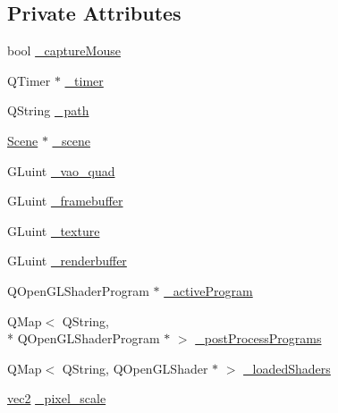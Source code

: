 \subsection*{Private Attributes}
\begin{DoxyCompactItemize}
\item 
bool \hyperlink{class_my_open_g_l_widget_af001d889fec5469aa3e67c11ae48b29d}{\+\_\+capture\+Mouse}
\item 
Q\+Timer $\ast$ \hyperlink{class_my_open_g_l_widget_aa6ba509f0ef6e8c2d266b83e1d380eb8}{\+\_\+timer}
\item 
Q\+String \hyperlink{class_my_open_g_l_widget_a7b3d69ddf0b3509a196edbfeb78407c6}{\+\_\+path}
\item 
\hyperlink{class_scene}{Scene} $\ast$ \hyperlink{class_my_open_g_l_widget_a26a1f259357dd7c8822d715d81591395}{\+\_\+scene}
\item 
G\+Luint \hyperlink{class_my_open_g_l_widget_a63a814817d1af6ea49036edac108183b}{\+\_\+vao\+\_\+quad}
\item 
G\+Luint \hyperlink{class_my_open_g_l_widget_ab39ecf367a98c1bd5e1dbeeb8b44a255}{\+\_\+framebuffer}
\item 
G\+Luint \hyperlink{class_my_open_g_l_widget_a18d7f106f5e12568f5db59d8c4a71706}{\+\_\+texture}
\item 
G\+Luint \hyperlink{class_my_open_g_l_widget_a8385a49fb5113010acc3ddd67080ed1a}{\+\_\+renderbuffer}
\item 
Q\+Open\+G\+L\+Shader\+Program $\ast$ \hyperlink{class_my_open_g_l_widget_a24571f61604a92b622b49609bc0f3f5b}{\+\_\+active\+Program}
\item 
Q\+Map$<$ Q\+String, \\*
Q\+Open\+G\+L\+Shader\+Program $\ast$ $>$ \hyperlink{class_my_open_g_l_widget_afde13326f4f01ede3cac0ee4f389a594}{\+\_\+post\+Process\+Programs}
\item 
Q\+Map$<$ Q\+String, Q\+Open\+G\+L\+Shader $\ast$ $>$ \hyperlink{class_my_open_g_l_widget_ab02762bc0b4cb541f7ad42fdbd7a73f7}{\+\_\+loaded\+Shaders}
\item 
\hyperlink{structvec2}{vec2} \hyperlink{class_my_open_g_l_widget_a543e9cc55491a8e07a7bb5eb54633351}{\+\_\+pixel\+\_\+scale}
\end{DoxyCompactItemize}


